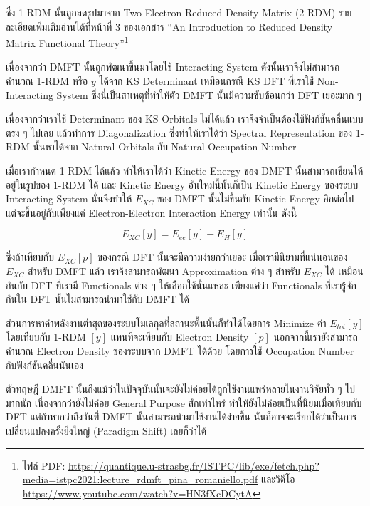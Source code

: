 ซึ่ง 1-RDM นั้นถูกลดรูปมาจาก Two-Electron Reduced Density Matrix (2-RDM) รายละเอียดเพิ่มเติมอ่านได้ที่หน้าที่ 3 ของเอกสาร
\enquote{An Introduction to Reduced Density Matrix Functional Theory}\footnote{ไฟล์ PDF:
  \url{https://quantique.u-strasbg.fr/ISTPC/lib/exe/fetch.php?media=istpc2021:lecture_rdmft_pina_romaniello.pdf}
  และวิดีโอ \url{https://www.youtube.com/watch?v=HN3fXcDCytA}}

เนื่องจากว่า DMFT นั้นถูกพัฒนาขึ้นมาโดยใช้ Interacting System ดังนั้นเราจึงไม่สามารถคำนวณ 1-RDM หรือ $y$ ได้จาก KS Determinant
เหมือนกรณี KS DFT ที่เราใช้ Non-Interacting System ซึ่งนี่เป็นสาเหตุที่ทำให้ตัว DMFT นั้นมีความซับซ้อนกว่า DFT เยอะมาก ๆ

เนื่องจากว่าเราใช้ Determinant ของ KS Orbitals ไม่ได้แล้ว เราจึงจำเป็นต้องใช้ฟังก์ชันคลื่นแบบตรง ๆ ไปเลย แล้วทำการ Diagonalization
ซึ่งทำให้เราได้ว่า Spectral Representation ของ 1-RDM นั้นหาได้จาก Natural Orbitals กับ Natural Occupation Number

เมื่อเรากำหนด 1-RDM ได้แล้ว ทำให้เราได้ว่า Kinetic Energy ของ DMFT นั้นสามารถเขียนให้อยู่ในรูปของ 1-RDM ได้ และ Kinetic Energy
อันใหม่นี้นั้นก็เป็น Kinetic Energy ของระบบ Interacting System นั่นจึงทำให้ $E_{XC}$ ของ DMFT นั้นไม่ขึ้นกับ Kinetic Energy อีกต่อไป
แต่จะขึ้นอยู่กับเพียงแค่ Electron-Electron Interaction Energy เท่านั้น ดังนี้

\begin{equation}
  E_{XC}[y] = E_{ee}[y] - E_{H}[y]
\end{equation}

\noindent ซึ่งถ้าเทียบกับ $E_{XC}[p]$ ของกรณี DFT นั้นจะมีความง่ายกว่าเยอะ เมื่อเรามีนิยามที่แน่นอนของ $E_{XC}$ สำหรับ DMFT แล้ว
เราจึงสามารถพัฒนา Approximation ต่าง ๆ สำหรับ $E_{XC}$ ได้ เหมือนกันกับ DFT ที่เรามี Functionals ต่าง ๆ ให้เลือกใช้นั่นแหละ
เพียงแค่ว่า Functionals ที่เรารู้จักกันใน DFT นั้นไม่สามารถนำมาใช้กับ DMFT ได้

ส่วนการหาค่าพลังงานต่ำสุดของระบบโมเลกุลที่สถานะพื้นนั้นก็ทำได้โดยการ Minimize ค่า $E_{tot}[y]$ โดยเทียบกับ 1-RDM $[y]$ แทนที่จะเทียบกับ
Electron Density $[p]$ นอกจากนี้เรายังสามารถคำนวณ Electron Density ของระบบจาก DMFT ได้ด้วย โดยการใช้ Occupation Number
กับฟังก์ชันคลื่นนั่นเอง

ตัวทฤษฎี DMFT นั้นถึงแม้ว่าในปัจจุบันนั้นจะยังไม่ค่อยได้ถูกใช้งานแพร่หลายในงานวิจัยทั่ว ๆ ไปมากนัก เนื่องจากว่ายังไม่ค่อย General Purpose
สักเท่าไหร่ ทำให้ยังไม่ค่อยเป็นที่นิยมเมื่อเทียบกับ DFT แต่ถ้าหากว่าถึงวันที่่ DMFT นั้นสามารถนำมาใช้งานได้ง่ายขึ้น นั่นก็อาจจะเรียกได้ว่าเป็นการ%
เปลี่ยนแปลงครั้งยิ่งใหญ่ (Paradigm Shift) เลยก็ว่าได้
